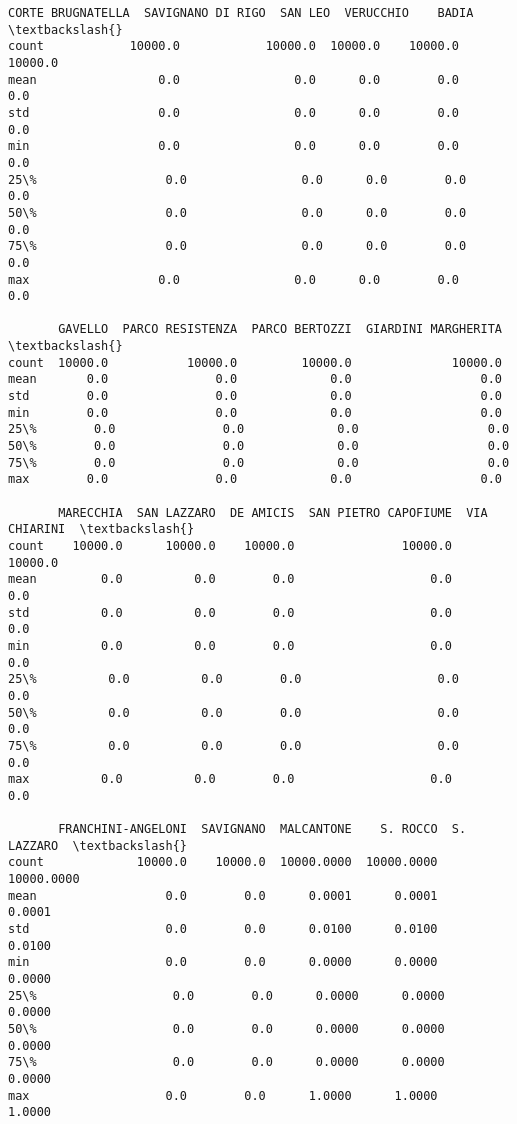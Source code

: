 \documentclass[11pt]{article}
\begin{document}
\begin{tcolorbox}[breakable, size=fbox, boxrule=.5pt, pad at break*=1mm, opacityfill=0]
\begin{Verbatim}[commandchars=\\\{\}]
       CORTE BRUGNATELLA  SAVIGNANO DI RIGO  SAN LEO  VERUCCHIO    BADIA  \textbackslash{}
count            10000.0            10000.0  10000.0    10000.0  10000.0
mean                 0.0                0.0      0.0        0.0      0.0
std                  0.0                0.0      0.0        0.0      0.0
min                  0.0                0.0      0.0        0.0      0.0
25\%                  0.0                0.0      0.0        0.0      0.0
50\%                  0.0                0.0      0.0        0.0      0.0
75\%                  0.0                0.0      0.0        0.0      0.0
max                  0.0                0.0      0.0        0.0      0.0

       GAVELLO  PARCO RESISTENZA  PARCO BERTOZZI  GIARDINI MARGHERITA  \textbackslash{}
count  10000.0           10000.0         10000.0              10000.0
mean       0.0               0.0             0.0                  0.0
std        0.0               0.0             0.0                  0.0
min        0.0               0.0             0.0                  0.0
25\%        0.0               0.0             0.0                  0.0
50\%        0.0               0.0             0.0                  0.0
75\%        0.0               0.0             0.0                  0.0
max        0.0               0.0             0.0                  0.0

       MARECCHIA  SAN LAZZARO  DE AMICIS  SAN PIETRO CAPOFIUME  VIA CHIARINI  \textbackslash{}
count    10000.0      10000.0    10000.0               10000.0       10000.0
mean         0.0          0.0        0.0                   0.0           0.0
std          0.0          0.0        0.0                   0.0           0.0
min          0.0          0.0        0.0                   0.0           0.0
25\%          0.0          0.0        0.0                   0.0           0.0
50\%          0.0          0.0        0.0                   0.0           0.0
75\%          0.0          0.0        0.0                   0.0           0.0
max          0.0          0.0        0.0                   0.0           0.0

       FRANCHINI-ANGELONI  SAVIGNANO  MALCANTONE    S. ROCCO  S. LAZZARO  \textbackslash{}
count             10000.0    10000.0  10000.0000  10000.0000  10000.0000
mean                  0.0        0.0      0.0001      0.0001      0.0001
std                   0.0        0.0      0.0100      0.0100      0.0100
min                   0.0        0.0      0.0000      0.0000      0.0000
25\%                   0.0        0.0      0.0000      0.0000      0.0000
50\%                   0.0        0.0      0.0000      0.0000      0.0000
75\%                   0.0        0.0      0.0000      0.0000      0.0000
max                   0.0        0.0      1.0000      1.0000      1.0000


\end{Verbatim}
\end{tcolorbox}
\end{document}
